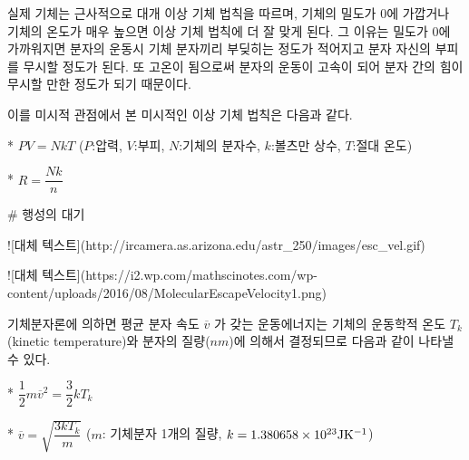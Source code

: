 실제 기체는 근사적으로 대개 이상 기체 법칙을 따르며, 기체의 밀도가 0에 가깝거나 기체의 온도가 매우 높으면 이상 기체 법칙에 더 잘 맞게 된다. 그 이유는 밀도가 0에 가까워지면 분자의 운동시 기체 분자끼리 부딪히는 정도가 적어지고 분자 자신의 부피를 무시할 정도가 된다. 또 고온이 됨으로써 분자의 운동이 고속이 되어 분자 간의 힘이 무시할 만한 정도가 되기 때문이다.

이를 미시적 관점에서 본 미시적인 이상 기체 법칙은 다음과 같다.

*  $ PV = N k T $
($P$:압력, $V$:부피, $N$:기체의 분자수, $k$:볼츠만 상수, $T$:절대 온도)

*  $ R = \dfrac{Nk}{n} $



# 행성의 대기


![대체 텍스트](http://ircamera.as.arizona.edu/astr_250/images/esc_vel.gif)

![대체 텍스트](https://i2.wp.com/mathscinotes.com/wp-content/uploads/2016/08/MolecularEscapeVelocity1.png)

기체분자론에 의하면 평균 분자 속도 ${\overline{v}}$ 가 갖는 운동에너지는 기체의 운동학적 온도 $T_{k}$ (kinetic temperature)와 분자의 질량($nm$)에 의해서 결정되므로 다음과 같이 나타낼 수 있다.

*  $ \dfrac{1}{2} m {\overline{v}}^{2} = \dfrac{3}{2} k T_{k}$

*  $ \overline{v} = \sqrt {\dfrac{3kT_{k}}{m}} $
($m$: 기체분자 1개의 질량, $k = 1.380658 \times 10^{23}\rm{J K^{-1}}$) 









